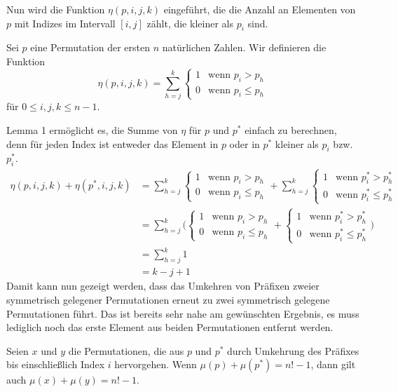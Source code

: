 \documentclass[a4paper, 10pt, ngerman]{article}
\begin{document}
Nun wird die Funktion $\eta(p, i, j, k)$ eingeführt, die die Anzahl an Elementen von $p$ mit Indizes im Intervall $[i, j]$ zählt, die kleiner als $p_i$ sind.
\begin{definition}
    Sei $p$ eine Permutation der ersten $n$ natürlichen Zahlen. Wir definieren die Funktion
    $$
        \eta(p, i, j, k) = \sum_{h = j}^k
        \begin{cases}
            1 & \text{wenn } p_i > p_h   \\
            0 & \text{wenn } p_i \le p_h
        \end{cases}
    $$
    für $0 \le i, j, k \le n - 1$.
\end{definition}
Lemma 1 ermöglicht es, die Summe von $\eta$ für $p$ und $p^*$ einfach zu berechnen, denn für jeden Index ist entweder das Element in $p$ oder in $p^*$ kleiner als $p_i$ bzw. $p^*_i$.
\begin{align*}
    \eta(p, i, j, k) + \eta(p^*, i, j, k) & = \sum_{h = j}^k
    \begin{cases}
        1 & \text{wenn } p_i > p_h   \\
        0 & \text{wenn } p_i \le p_h
    \end{cases} + \sum_{h = j}^k
    \begin{cases}
        1 & \text{wenn } p^*_i > p^*_h   \\
        0 & \text{wenn } p^*_i \le p^*_h
    \end{cases}                                 \\
                                          & = \sum_{h = j}^k \Bigg (
    \begin{cases}
            1 & \text{wenn } p_i > p_h   \\
            0 & \text{wenn } p_i \le p_h
        \end{cases} +
    \begin{cases}
            1 & \text{wenn } p^*_i > p^*_h   \\
            0 & \text{wenn } p^*_i \le p^*_h
        \end{cases} \Bigg )                                 \\
                                          & = \sum_{h = j}^k 1       \\
                                          & = k - j + 1
\end{align*}
Damit kann nun gezeigt werden, dass das Umkehren von Präfixen zweier symmetrisch gelegener Permutationen erneut zu zwei symmetrisch gelegene Permutationen führt. Das ist bereits sehr nahe am gewünschten Ergebnis, es muss lediglich noch das erste Element aus beiden Permutationen entfernt werden.
\begin{lemma}Seien $x$ und $y$ die Permutationen, die aus $p$ und $p^*$ durch Umkehrung des Präfixes bis einschließlich Index $i$ hervorgehen. Wenn $\mu(p) + \mu(p^*) = n! - 1$, dann gilt auch $\mu(x) + \mu(y) = n! - 1$.
\end{lemma}
\end{document}

